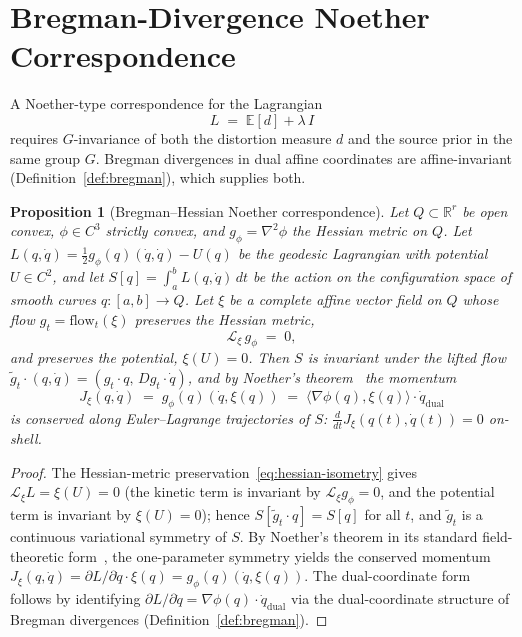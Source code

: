 \documentclass[11pt,a4paper]{article}
\theoremstyle{plain}
\newtheorem{proposition}[theorem]{Proposition}
\theoremstyle{definition}
\theoremstyle{remark}
\newcommand{\RR}{\mathbb{R}}
\begin{document}
\section{Bregman-Divergence Noether Correspondence}\label{sec:noether}

A Noether-type correspondence for the Lagrangian
\begin{equation}\label{eq:lagrangian}
  L \;=\; \mathbb{E}[d] + \lambda\, I
\end{equation}
requires $G$-invariance of both the distortion measure $d$ and the
source prior in the same group $G$. Bregman divergences in dual affine
coordinates are affine-invariant (Definition~\ref{def:bregman}), which
supplies both.

\begin{proposition}[Bregman--Hessian Noether correspondence]
\label{prop:noether}
Let $Q \subset \RR^r$ be open convex, $\phi \in C^3$ strictly convex,
and $g_\phi = \nabla^2 \phi$ the Hessian metric on $Q$. Let
$L(q, \dot q) = \tfrac{1}{2} g_\phi(q)(\dot q, \dot q) - U(q)$ be the
geodesic Lagrangian with potential $U \in C^2$, and let
$S[q] = \int_a^b L(q, \dot q)\,dt$ be the action on the configuration
space of smooth curves $q : [a, b] \to Q$. Let $\xi$ be a complete
affine vector field on $Q$ whose flow $g_t = \mathrm{flow}_t(\xi)$
preserves the Hessian metric,
\begin{equation}\label{eq:hessian-isometry}
  \mathcal L_\xi\, g_\phi \;=\; 0,
\end{equation}
and preserves the potential, $\xi(U) = 0$. Then $S$ is invariant under
the lifted flow $\tilde g_t \cdot (q, \dot q) = (g_t \cdot q,\,
Dg_t \cdot \dot q)$, and by Noether's theorem~\cite{noether1918,olver1993}
the momentum
\begin{equation}\label{eq:noether-current}
  J_\xi(q, \dot q) \;=\; g_\phi(q)(\dot q, \xi(q)) \;=\; \langle \nabla \phi(q), \xi(q) \rangle \cdot \dot q_{\mathrm{dual}}
\end{equation}
is conserved along Euler--Lagrange trajectories of $S$: $\frac{d}{dt}
J_\xi(q(t), \dot q(t)) = 0$ on-shell.
\end{proposition}

\begin{proof}
The Hessian-metric preservation~\eqref{eq:hessian-isometry} gives
$\mathcal L_\xi L = \xi(U) = 0$ (the kinetic term is invariant by
$\mathcal L_\xi g_\phi = 0$, and the potential term is invariant by
$\xi(U) = 0$); hence $S[\tilde g_t \cdot q] = S[q]$ for all $t$, and
$\tilde g_t$ is a continuous variational symmetry of $S$. By
Noether's theorem in its standard field-theoretic form~\cite{olver1993},
the one-parameter symmetry yields the conserved momentum
$J_\xi(q, \dot q) = \partial L / \partial \dot q \cdot \xi(q) =
g_\phi(q)(\dot q, \xi(q))$. The dual-coordinate form follows by
identifying $\partial L / \partial \dot q = \nabla \phi(q) \cdot \dot
q_{\mathrm{dual}}$ via the dual-coordinate structure of Bregman
divergences (Definition~\ref{def:bregman}).
\end{proof}
\end{document}
